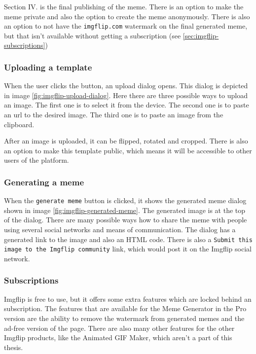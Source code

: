 
Section IV. is the final publishing of the meme. There is an option to make the meme private and also the option to create the meme anonymously. There is also an option to not have the \texttt{imgflip.com} watermark on the final generated meme, but that isn't available without getting a subscription (see \autoref{sec:imgflip-subscriptions})


\subsubsection{Uploading a template}
\label{sec:imgflip-uploading-template}


When the user clicks the  button, an upload dialog opens. This dialog is depicted in image \ref{fig:imgflip-upload-dialog}. Here there are three possible ways to upload an image. The first one is to select it from the device. The second one is to paste an \acrfull{url} to the desired image. The third one is to paste an image from the clipboard.

After an image is uploaded, it can be flipped, rotated and cropped. There is also an option to make this template public, which means it will be accessible to other users of the platform.


\subsubsection{Generating a meme}

When the \texttt{generate meme} button is clicked, it shows the generated meme dialog shown in image \ref{fig:imgflip-generated-meme}. The generated image is at the top of the dialog. There are many possible ways how to share the meme with people using several social networks and means of communication. The dialog has a generated link to the image and also an HTML code. There is also a \texttt{Submit this image to the Imgflip community} link, which would post it on the Imgflip social network.

\subsubsection{Subscriptions}
\label{sec:imgflip-subscriptions}

Imgflip is free to use, but it offers some extra features which are locked behind an  subscription. The features that are available for the Meme Generator in the Pro version are the ability to remove the  watermark from generated memes and the ad-free version of the page. There are also many other features for the other Imgflip products, like the Animated GIF Maker, which aren't a part of this thesis.

